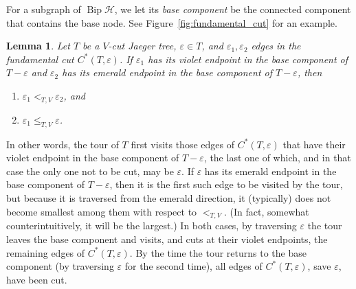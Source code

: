 \documentclass[10pt]{amsart}
\newtheorem{lemma}[theo]{Lemma}
\theoremstyle{definition}\newtheorem{defi}[theo]{Definition}
\theoremstyle{remark}\newtheorem{rema}[theo]{Remark}
\newcommand{\HH}{\mathcal H}
\DeclareMathOperator{\bip}{Bip}
\begin{document}
For a subgraph of $\bip\HH$, we let its \emph{base component} be the connected component that contains the base node. See Figure~\ref{fig:fundamental_cut} for an example.

\begin{lemma}\label{l:char_Jaeger_cuts}
	Let $T$ be a $V$-cut Jaeger tree, $\varepsilon \in T$,
	and $\varepsilon_1, \varepsilon_2$ edges in the fundamental cut $C^*(T,\varepsilon)$. If $\varepsilon_1$ has its violet endpoint in the base component of $T-\varepsilon$ and $\varepsilon_2$ has its emerald endpoint in the base component of $T-\varepsilon$, then 
\begin{enumerate}[label=(\roman*)]
	\item \label{egyegy} $\varepsilon_1 <_{T,V} \varepsilon_2$, and
	\item \label{kettoketto} $\varepsilon_1 \leq_{T,V} \varepsilon$.
\end{enumerate}
\end{lemma}

In other words, the tour of $T$ first visits those edges of $C^*(T,\varepsilon)$ that have their violet endpoint in the base component of $T-\varepsilon$, the last one of which, and in that case the only one not to be cut, may be $\varepsilon$. If $\varepsilon$ has its emerald endpoint in the base component of $T-\varepsilon$, then it is the first such edge to be visited by the tour, but because it is traversed from the emerald direction, it (typically) does not become smallest among them with respect to $<_{T,V}$. (In fact, somewhat counterintuitively, it will be the largest.) In both cases, by traversing $\varepsilon$ the tour leaves the base component and visits, and cuts at their violet endpoints, the remaining edges of $C^*(T,\varepsilon)$. By the time the tour returns to the base component (by traversing $\varepsilon$ for the second time), all edges of $C^*(T,\varepsilon)$, save $\varepsilon$, have been cut.
\end{document}
